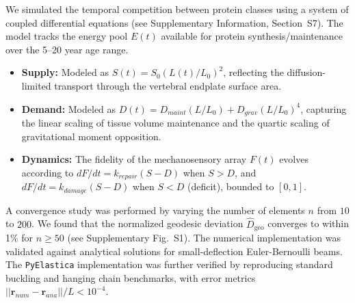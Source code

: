\documentclass[11pt]{article}
\begin{document}
We simulated the temporal competition between protein classes using a system of coupled differential equations (see Supplementary Information, Section~S7). The model tracks the energy pool $E(t)$ available for protein synthesis/maintenance over the 5--20 year age range.
\begin{itemize}
    \item \textbf{Supply:} Modeled as $S(t) = S_0 (L(t)/L_0)^2$, reflecting the diffusion-limited transport through the vertebral endplate surface area.
    \item \textbf{Demand:} Modeled as $D(t) = D_{maint} (L/L_0) + D_{grav} (L/L_0)^4$, capturing the linear scaling of tissue volume maintenance and the quartic scaling of gravitational moment opposition.
    \item \textbf{Dynamics:} The fidelity of the mechanosensory array $F(t)$ evolves according to $dF/dt = k_{repair}(S - D)$ when $S > D$, and $dF/dt = k_{damage}(S - D)$ when $S < D$ (deficit), bounded to $[0, 1]$.
\end{itemize}

A convergence study was performed by varying the number of elements $n$ from $10$ to $200$. We found that the normalized geodesic deviation $\widehat{D}_{\mathrm{geo}}$ converges to within 1\% for $n \geq 50$ (see Supplementary Fig.~S1). The numerical implementation was validated against analytical solutions for small-deflection Euler-Bernoulli beams. The \texttt{PyElastica} implementation was further verified by reproducing standard buckling and hanging chain benchmarks, with error metrics $||\mathbf{r}_{num} - \mathbf{r}_{ana}||/L < 10^{-4}$.
\end{document}
